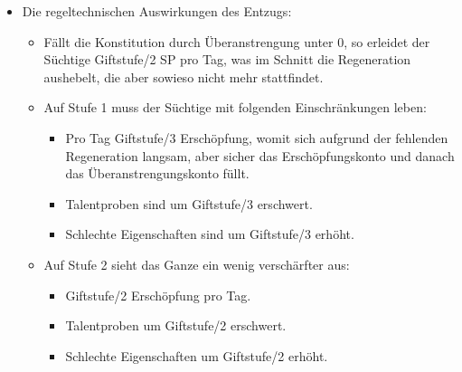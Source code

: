\begin{itemize}
	\item Die regeltechnischen Auswirkungen des Entzugs:
		\begin{itemize}
			\item Fällt die Konstitution durch Überanstrengung unter 0, so erleidet der Süchtige Giftstufe/2 SP pro Tag, was im Schnitt die Regeneration aushebelt, die aber sowieso nicht mehr stattfindet.
			\item Auf Stufe 1 muss der Süchtige mit folgenden Einschränkungen leben: 
				\begin{itemize}
					\item Pro Tag Giftstufe/3 Erschöpfung, womit sich aufgrund der fehlenden Regeneration langsam, aber sicher das Erschöpfungskonto und danach das Überanstrengungskonto füllt. 
					\item Talentproben sind um Giftstufe/3 erschwert.
					\item Schlechte Eigenschaften sind um Giftstufe/3 erhöht.
				\end{itemize}
			\item Auf Stufe 2 sieht das Ganze ein wenig verschärfter aus: 
				\begin{itemize}
					\item Giftstufe/2 Erschöpfung pro Tag.
					\item Talentproben um Giftstufe/2 erschwert.
					\item Schlechte Eigenschaften um Giftstufe/2 erhöht.
				\end{itemize}
		\end{itemize}
\end{itemize}

